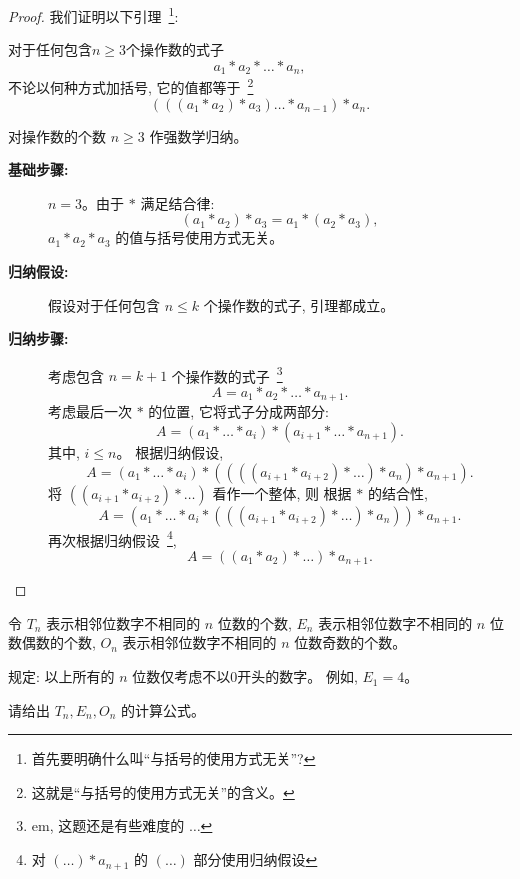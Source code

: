 \documentclass[a4paper, justified]{tufte-handout}
\begin{document}
\begin{proof}
  我们证明以下引理~\footnote{首先要明确什么叫``与括号的使用方式无关''?}:
  \begin{lemma*}
    对于任何包含$n \ge 3$个操作数的式子
    \[
      a_{1} \ast a_{2} \ast \dots \ast a_{n},
    \]
    不论以何种方式加括号, 它的值都等于~\footnote{这就是``与括号的使用方式无关''的含义。}
    \[
      (((a_{1} \ast a_{2}) \ast a_{3}) \dots \ast a_{n-1}) \ast a_{n}.
    \]
  \end{lemma*}

  \vspace{1em}
  \noindent 对操作数的个数 $n \ge 3$ 作强数学归纳。
  \begin{description}
    \item[{\bf 基础步骤:}] $n = 3$。由于 $\ast$ 满足结合律:
      \[
        (a_{1} \ast a_{2}) \ast a_{3} = a_{1} \ast (a_{2} \ast a_{3}),
      \]
      $a_{1} \ast a_{2} \ast a_{3}$ 的值与括号使用方式无关。
    \item[{\bf 归纳假设:}] 假设对于任何包含 $n \le k$ 个操作数的式子, 引理都成立。
    \item[{\bf 归纳步骤:}] 考虑包含 $n = k + 1$ 个操作数的式子~\footnote{em, 这题还是有些难度的 $\dots$}
      \[
        A = a_{1} \ast a_{2} \ast \dots \ast a_{n+1}.
      \]
      考虑最后一次 $\ast$ 的位置, 它将式子分成两部分:
      \[
        A = (a_{1} \ast \dots \ast a_{i}) \ast (a_{i+1} \ast \dots \ast a_{n+1}).
      \]
      其中, $i \le n$。
      根据归纳假设,
      \[
        A = (a_{1} \ast \dots \ast a_{i}) \ast
          (\boxed{(((a_{i+1} \ast a_{i+2}) \ast \dots) \ast a_{n})} \ast a_{n+1}).
      \]
      将 $((a_{i+1} \ast a_{i+2}) \ast \dots)$ 看作一个整体, 则
      根据 $\ast$ 的结合性,
      \[
        A = (a_{1} \ast \dots \ast a_{i} \ast
          \boxed{(((a_{i+1} \ast a_{i+2}) \ast \dots) \ast a_{n})}) \ast a_{n+1}.
      \]
      再次根据归纳假设~\footnote{对 $(\dots) \ast a_{n+1}$ 的 $(\dots)$ 部分使用归纳假设},
      \[
        A = ((a_{1} \ast a_{2}) \ast \dots) \ast a_{n+1}.
      \]
  \end{description}
\end{proof}

\begin{problem}
  令 $T_{n}$ 表示相邻位数字不相同的 $n$ 位数的个数,
  $E_{n}$ 表示相邻位数字不相同的 $n$ 位数偶数的个数,
  $O_{n}$ 表示相邻位数字不相同的 $n$ 位数奇数的个数。

  \noindent 规定: 以上所有的 $n$ 位数仅考虑不以0开头的数字。
  例如, $E_{1} = 4$。

  \noindent 请给出 $T_{n}, E_{n}, O_{n}$ 的计算公式。
\end{problem}
\end{document}
